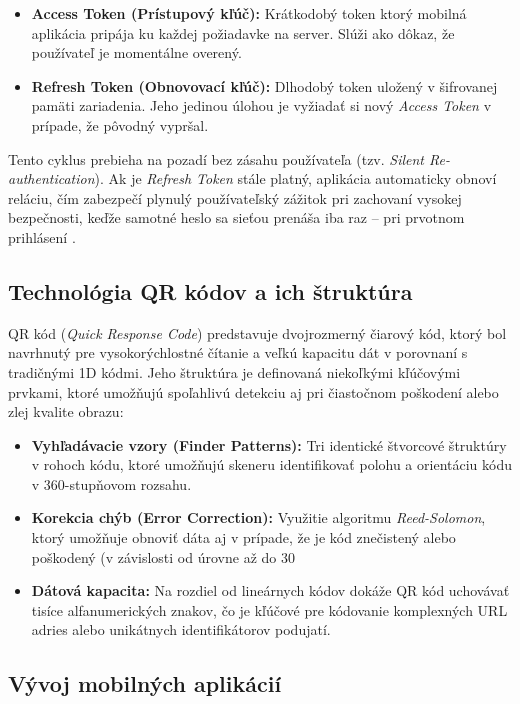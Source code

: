 \begin{itemize}[noitemsep]
    \item \textbf{Access Token (Prístupový kľúč):} Krátkodobý token 
    ktorý mobilná aplikácia pripája ku každej požiadavke na server. Slúži ako dôkaz, že používateľ je momentálne overený.
    \item \textbf{Refresh Token (Obnovovací kľúč):} Dlhodobý token uložený v šifrovanej pamäti zariadenia.
     Jeho jedinou úlohou je vyžiadať si nový \textit{Access Token} v prípade, že pôvodný vypršal.
\end{itemize}

Tento cyklus prebieha na pozadí bez zásahu používateľa (tzv. \textit{Silent Re-authentication}).
Ak je \textit{Refresh Token} stále platný, aplikácia automaticky obnoví reláciu, čím zabezpečí plynulý 
používateľský zážitok pri zachovaní vysokej bezpečnosti, keďže samotné heslo sa sieťou prenáša iba raz – pri prvotnom prihlásení \cite{auth0_refresh_tokens}.


\subsection{Technológia QR kódov a ich štruktúra}
QR kód (\textit{Quick Response Code}) predstavuje dvojrozmerný čiarový kód, ktorý bol navrhnutý pre vysokorýchlostné čítanie a 
veľkú kapacitu dát v porovnaní s tradičnými 1D kódmi. Jeho štruktúra je definovaná niekoľkými kľúčovými prvkami, ktoré umožňujú 
spoľahlivú detekciu aj pri čiastočnom poškodení alebo zlej kvalite obrazu:

\begin{itemize}[noitemsep]
\item \textbf{Vyhľadávacie vzory (Finder Patterns):} Tri identické štvorcové štruktúry v rohoch kódu, ktoré umožňujú skeneru identifikovať polohu a orientáciu kódu v 360-stupňovom rozsahu.
\item \textbf{Korekcia chýb (Error Correction):} Využitie algoritmu \textit{Reed-Solomon}, ktorý umožňuje obnoviť dáta aj v prípade, že je kód znečistený alebo poškodený (v závislosti od úrovne až do 30 %
\item \textbf{Dátová kapacita:} Na rozdiel od lineárnych kódov dokáže QR kód uchovávať tisíce alfanumerických znakov, čo je kľúčové pre kódovanie komplexných URL adries alebo unikátnych identifikátorov podujatí.
\end{itemize}  \cite{7966807}



  \iffalse
\subsection{Vývoj mobilných aplikácií}


